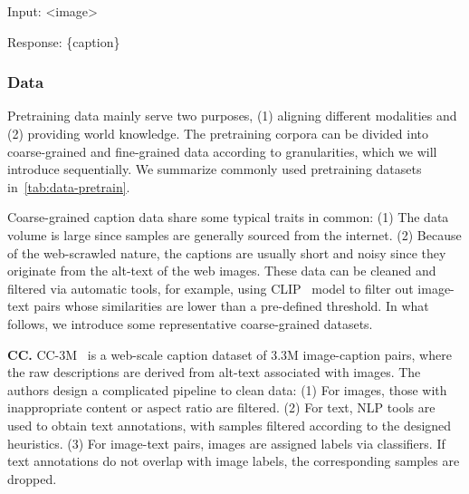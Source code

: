 \begin{table}[!t]
\begin{tcolorbox}

Input: \textcolor[rgb]{0,0,0.8}{<image>}\ \par

Response: \textcolor[rgb]{0.8,0,0}{\{caption\}}

\end{tcolorbox}
\caption{A simplified template to structure the caption data. \textcolor[rgb]{0,0,0.8}{\{<image>\}} is the placeholder for the visual tokens, and \textcolor[rgb]{0.8,0,0}{\{caption\}} is the caption for the image. Note that only the part marked in \textcolor[rgb]{0.8,0,0}{red} is used for loss calculation.}
\label{pretrain_prompt}
\end{table}


\subsubsection{Data}
Pretraining data mainly serve two purposes, \ie (1) aligning different modalities and (2) providing world knowledge. 
The pretraining corpora can be divided into coarse-grained and fine-grained data according to granularities, which we will introduce sequentially. We summarize commonly used pretraining datasets in~\cref{tab:data-pretrain}.

Coarse-grained caption data share some typical traits in common: (1) The data volume is large since samples are generally sourced from the internet. (2) Because of the web-scrawled nature, the captions are usually short and noisy since they originate from the alt-text of the web images. 
These data can be cleaned and filtered via automatic tools, for example, using CLIP~\cite{clip} model to filter out image-text pairs whose similarities are lower than a pre-defined threshold.
In what follows, we introduce some representative coarse-grained datasets.


\noindent \textbf{CC.} 
CC-3M~\cite{CC} is a web-scale caption dataset of 3.3M image-caption pairs, where the raw descriptions are derived from alt-text associated with images. 
The authors design a complicated pipeline to clean data:
(1) For images, those with inappropriate content or aspect ratio are filtered. (2) For text, NLP tools are used to obtain text annotations, with samples filtered according to the designed heuristics. (3) For image-text pairs, images are assigned labels via classifiers. If text annotations do not overlap with image labels, the corresponding samples are dropped.

